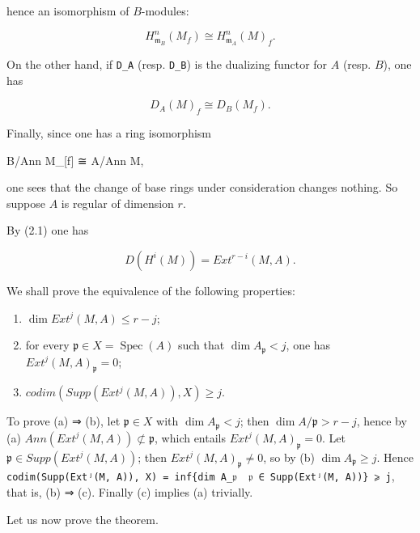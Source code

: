 \documentclass[
  11pt,
  a4paper,
]{book}
\newenvironment{Shaded}{}{}
\newcommand{\NormalTok}[1]{#1}
\begin{document}
hence an isomorphism of \(B\)-modules:

\[ H^{n}_{\mathfrak{m}_{B}}(M_{f}) \cong H^{n}_{\mathfrak{m}_{A}}(M)_{f}. \]

On the other hand, if \texttt{D\_A} (resp. \texttt{D\_B}) is the
dualizing functor for \(A\) (resp. \(B\)), one has

\[ D_{A}(M)_{f} \cong D_{B}(M_{f}). \]

Finally, since one has a ring isomorphism

\begin{Shaded}
\begin{Highlighting}[]
\NormalTok{B/Ann M\_[f] ≅ A/Ann M,}
\end{Highlighting}
\end{Shaded}

one sees that the change of base rings under consideration changes
nothing. So suppose \(A\) is regular of dimension \(r\).

By (2.1) one has

\[ D(H^{i}(M)) = Ext^{r-i}(M, A). \]

We shall prove the equivalence of the following properties:

\begin{enumerate}
\def\labelenumi{(\alph{enumi})}
\item
  \(\dim Ext^{j}(M, A) \leqslant r - j\);
\item
  for every \(\mathfrak{p} \in X = \operatorname{Spec}(A)\) such that
  \(\dim A_{\mathfrak{p}} < j\), one has \(Ext^{j}(M,
  A)_{\mathfrak{p}} = 0\);
\item
  \(codim(Supp(Ext^{j}(M, A)), X) \geqslant j\).
\end{enumerate}

To prove (a) ⇒ (b), let \(\mathfrak{p} \in X\) with
\(\dim A_{\mathfrak{p}} < j\); then \(\dim A/\mathfrak{p} > r - j\),
hence by (a) \(Ann(Ext^{j}(M, A)) \not\subset \mathfrak{p}\), which
entails \(Ext^{j}(M, A)_{\mathfrak{p}} = 0\). Let
\(\mathfrak{p} \in Supp(Ext^{j}(M, A))\); then
\(Ext^{j}(M, A)_{\mathfrak{p}} \neq 0\), so by (b)
\(\dim A_{\mathfrak{p}}
\geqslant j\). Hence
\texttt{codim(Supp(Extʲ(M,\ A)),\ X)\ =\ inf\{dim\ A\_𝔭\ \textbar{}\ 𝔭\ ∈\ Supp(Extʲ(M,\ A))\}\ ⩾\ j},
that is, (b) ⇒ (c). Finally (c) implies (a) trivially.

Let us now prove the theorem.
\end{document}
